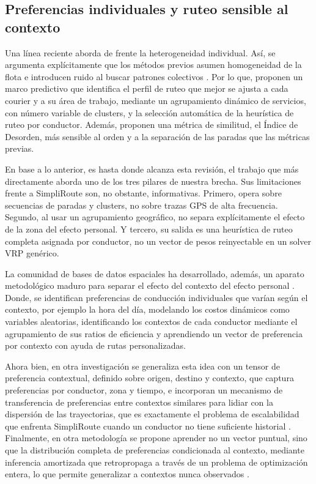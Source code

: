 \subsection{Preferencias individuales y ruteo sensible al contexto}

Una línea reciente aborda de frente la heterogeneidad individual. Así, se argumenta explícitamente que los métodos previos asumen homogeneidad de la flota e introducen ruido al buscar patrones colectivos \cite{pegadobardayo2024predictive}. Por lo que, proponen un marco predictivo que identifica el perfil de ruteo que mejor se ajusta a cada courier y a su área de trabajo, mediante un agrupamiento dinámico de servicios, con número variable de clusters, y la selección automática de la heurística de ruteo por conductor. Además, proponen una métrica de similitud, el Índice de Desorden, más sensible al orden y a la separación de las paradas que las métricas previas.

En base a lo anterior, es hasta donde alcanza esta revisión, el trabajo que más directamente aborda uno de los tres pilares de nuestra brecha. Sus limitaciones frente a SimpliRoute son, no obstante, informativas. Primero, opera sobre secuencias de paradas y clusters, no sobre trazas GPS de alta frecuencia. Segundo, al usar un agrupamiento geográfico, no separa explícitamente el efecto de la zona del efecto personal. Y tercero, su salida es una heurística de ruteo completa asignada por conductor, no un vector de pesos reinyectable en un solver VRP genérico.

La comunidad de bases de datos espaciales ha desarrollado, además, un aparato metodológico maduro para separar el efecto del contexto del efecto personal \cite{yang2015toward}. Donde, se identifican preferencias de conducción individuales que varían según el contexto, por ejemplo la hora del día, modelando los costos dinámicos como variables aleatorias, identificando los contextos de cada conductor mediante el agrupamiento de sus ratios de eficiencia y aprendiendo un vector de preferencia por contexto con ayuda de rutas personalizadas.

Ahora bien, en otra investigación se generaliza esta idea con un tensor de preferencia contextual, definido sobre origen, destino y contexto, que captura preferencias por conductor, zona y tiempo, e incorporan un mecanismo de transferencia de preferencias entre contextos similares para lidiar con la dispersión de las trayectorias, que es exactamente el problema de escalabilidad que enfrenta SimpliRoute cuando un conductor no tiene suficiente historial \cite{guo2020contextaware}. Finalmente, en otra metodología se propone  aprender no un vector puntual, sino que la distribución completa de preferencias condicionada al contexto, mediante inferencia amortizada que retropropaga a través de un problema de optimización entera, lo que permite generalizar a contextos nunca observados \cite{hudson2024contextual}.

